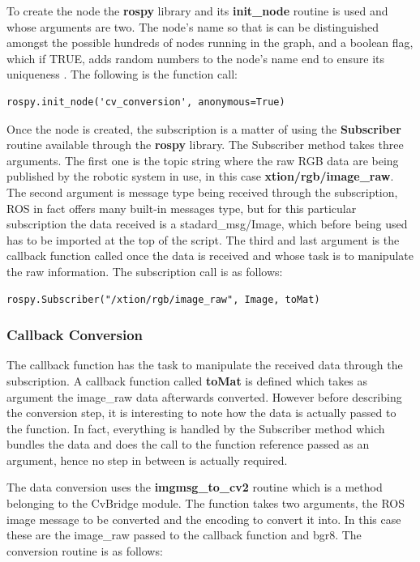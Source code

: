 To create the node the \textbf{rospy} library and its \textbf{init\_node} routine is used and whose arguments are two. The node's name so that is can be distinguished amongst the possible hundreds of nodes running in the graph, and a boolean flag, which if TRUE, adds random numbers to the node's name end to ensure its uniqueness \cite{website:nodes}. The following is the function call:

\begin{lstlisting}
rospy.init_node('cv_conversion', anonymous=True)
\end{lstlisting}

Once the node is created, the subscription is a matter of using the \textbf{Subscriber} routine available through the \textbf{rospy} library. The Subscriber method takes three arguments. The first one is the topic string where the raw RGB data are being published by the robotic system in use, in this case \textbf{xtion/rgb/image\_raw}. The second argument is message type being received through the subscription, ROS in fact offers many built-in messages type, but for this particular subscription the data received is a stadard\_msg/Image, which before being used has to be imported at the top of the script. The third and last argument is the callback function called once the data is received and whose task is to manipulate the raw information. The subscription call is as follows:

\begin{lstlisting}
rospy.Subscriber("/xtion/rgb/image_raw", Image, toMat)
\end{lstlisting}

\subsubsection{Callback Conversion}

The callback function has the task to manipulate the received data through the subscription. A callback function called \textbf{toMat} is defined which takes as argument the image\_raw data afterwards converted. However before describing the conversion step, it is interesting to note how the data is actually passed to the function. In fact, everything is handled by the Subscriber method which bundles the data and does the call to the function reference passed as an argument, hence no step in between is actually required.

The data conversion uses the \textbf{imgmsg\_to\_cv2} routine which is a method belonging to the CvBridge module. The function takes two arguments, the ROS image message to be converted and the encoding to convert it into. In this case these are the image\_raw passed to the callback function and bgr8. The conversion routine is as follows:

